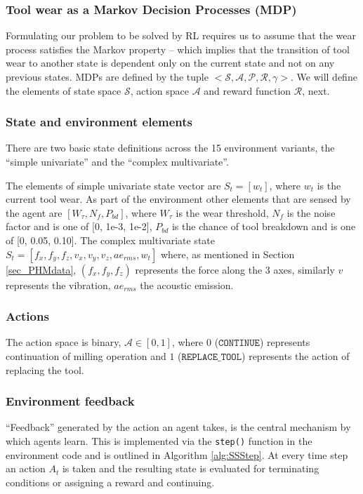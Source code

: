 \documentclass[referee, sn-mathphys-num]{sn-jnl}
\begin{document}
	\subsubsection*{Tool wear as a Markov Decision Processes (MDP)}
	Formulating our problem to be solved by RL requires us to assume that the wear process satisfies the Markov property -- which implies that the transition of tool wear to another state is dependent only on the current state and not on any previous states. MDPs are defined by the tuple $<\mathcal{S, A, P, R, \gamma}>$. We will define the elements of state space $\mathcal{S}$, action space $\mathcal{A}$ and reward function $\mathcal{R}$, next.
	
	\subsubsection*{State and environment elements}
	There are two basic state definitions across the 15 environment variants, the ``simple univariate'' and the ``complex multivariate''. 
	
	The elements of simple univariate state vector are $S_t = [w_t]$, where $w_t$ is the current tool wear. As part of the environment other elements that are sensed by the agent are $[W_\tau, N_f, P_{bd}]$, where $W_\tau$ is the wear threshold, $N_f$ is the noise factor and is one of [0, 1e-3, 1e-2], $P_{bd}$ is the chance of tool breakdown and is one of [0, 0.05, 0.10]. The complex multivariate state $S_t = [f_x, f_y, f_z, v_x, v_y, v_z, ae_{rms}, w_t]$ where, as mentioned in Section \ref{sec_PHMdata}, $(f_x, f_y, f_z)$ represents the force along the 3 axes, similarly $v$ represents the vibration, $ae_{rms}$ the acoustic emission.
	
	\subsubsection*{Actions}
	The action space is binary, $\mathcal{A} \in [0, 1]$, where $0$ ($\texttt{CONTINUE}$) represents continuation of milling operation and $1$ ($\texttt{REPLACE\_TOOL}$) represents the action of replacing the tool.
	
	\subsubsection*{Environment feedback}
	``Feedback'' generated by the action an agent takes, is the central mechanism by which agents learn. This is implemented via the \texttt{step()} function in the environment code and is outlined in Algorithm \ref{alg:SSStep}. At every time step an action $A_t$ is taken and the resulting state is evaluated for terminating conditions or assigning a reward and continuing.
	
\end{document}

